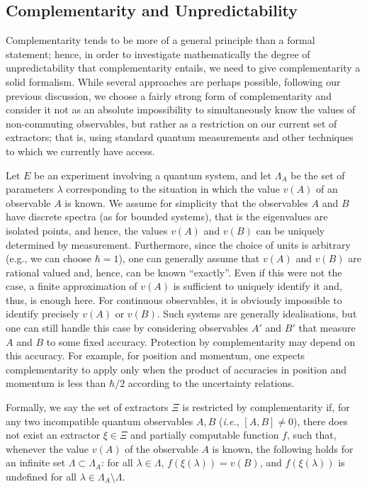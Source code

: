 \documentclass[information,article,accept,moreauthors,pdftex,12pt,a4paper]{mdpi}
\theoremstyle{mdpi}
\newcounter{ex}
\newcounter{re}
\theoremstyle{mdpidefinition}
\begin{document}
\subsection{Complementarity and Unpredictability}\label{sec:quantumComplUnpred}


Complementarity tends to be more of a general principle than a formal statement; hence, in order to investigate mathematically the degree of unpredictability that complementarity entails, we need to give complementarity a solid formalism.
While several approaches are perhaps possible, following our previous discussion, we choose a fairly strong form of complementarity and consider it not as an absolute impossibility to simultaneously know the values of non-commuting observables, but rather as a restriction on our current set of extractors; that is, using standard quantum measurements and other techniques to which we currently have access.

Let $E$ be an experiment involving a quantum system, and let $\Lambda_A$ be the set of parameters $\lambda$ corresponding to the situation in which the value $v(A)$ of an observable $A$ is known. We assume for simplicity that the observables $A$ and $B$ have discrete spectra (as for bounded systems), that is the eigenvalues are isolated points, and hence, the values $v(A)$ and $v(B)$ can be uniquely determined by measurement.
	Furthermore, since the choice of units is arbitrary (e.g., we can choose $\hbar=1$), one can generally assume that $v(A)$ and $v(B)$ are rational valued and, hence, can be known ``exactly''.
	Even if this were not the case, a finite approximation of $v(A)$ is sufficient to uniquely identify it and, thus, is enough here.
	For continuous observables, it is obviously impossible to identify precisely $v(A)$ or $v(B)$.
	Such systems are generally idealisations, but one can still handle this case by considering observables $A'$ and $B'$ that measure $A$ and $B$ to some fixed accuracy.
	Protection by complementarity may depend on this accuracy. For example, for position and momentum, one expects complementarity to apply only when the product of accuracies in position and momentum is less than $\hbar/2$ according to the uncertainty relations.

Formally, we say the set of extractors $\Xi$ is {restricted by complementarity} if, for any two incompatible quantum observables $A,B$ (\emph{i.e.}, $[A,B]\neq 0$), there does not exist an extractor $\xi\in\Xi$ and partially computable function $f$, such that, whenever the value $v(A)$ of the observable $A$ is known, the following holds for an infinite set $\Lambda\subset \Lambda_A$: for all $\lambda \in \Lambda$, $f(\xi(\lambda))=v(B)$, and $f(\xi(\lambda))$ is undefined for all $\lambda \in \Lambda_A \setminus \Lambda$.
\end{document}
